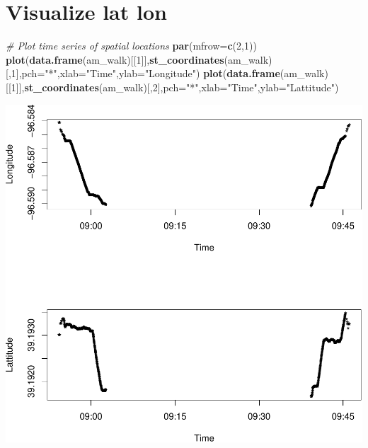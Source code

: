 \documentclass[
]{book}
\newenvironment{Shaded}{\begin{snugshade}}{\end{snugshade}}
\newcommand{\AttributeTok}[1]{\textcolor[rgb]{0.13,0.29,0.53}{#1}}
\newcommand{\CommentTok}[1]{\textcolor[rgb]{0.56,0.35,0.01}{\textit{#1}}}
\newcommand{\DecValTok}[1]{\textcolor[rgb]{0.00,0.00,0.81}{#1}}
\newcommand{\FunctionTok}[1]{\textcolor[rgb]{0.13,0.29,0.53}{\textbf{#1}}}
\newcommand{\NormalTok}[1]{#1}
\newcommand{\StringTok}[1]{\textcolor[rgb]{0.31,0.60,0.02}{#1}}
\begin{document}
\hypertarget{visualize-lat-lon}{%
\section{Visualize lat lon}\label{visualize-lat-lon}}

\begin{Shaded}
\begin{Highlighting}[]
\CommentTok{\# Plot time series of spatial locations}
\FunctionTok{par}\NormalTok{(}\AttributeTok{mfrow=}\FunctionTok{c}\NormalTok{(}\DecValTok{2}\NormalTok{,}\DecValTok{1}\NormalTok{))}
\FunctionTok{plot}\NormalTok{(}\FunctionTok{data.frame}\NormalTok{(am\_walk)[[}\DecValTok{1}\NormalTok{]],}\FunctionTok{st\_coordinates}\NormalTok{(am\_walk)[,}\DecValTok{1}\NormalTok{],}\AttributeTok{pch=}\StringTok{"*"}\NormalTok{,}\AttributeTok{xlab=}\StringTok{"Time"}\NormalTok{,}\AttributeTok{ylab=}\StringTok{"Longitude"}\NormalTok{)}
\FunctionTok{plot}\NormalTok{(}\FunctionTok{data.frame}\NormalTok{(am\_walk)[[}\DecValTok{1}\NormalTok{]],}\FunctionTok{st\_coordinates}\NormalTok{(am\_walk)[,}\DecValTok{2}\NormalTok{],}\AttributeTok{pch=}\StringTok{"*"}\NormalTok{,}\AttributeTok{xlab=}\StringTok{"Time"}\NormalTok{,}\AttributeTok{ylab=}\StringTok{"Lattitude"}\NormalTok{)}
\end{Highlighting}
\end{Shaded}

\includegraphics{_main_files/figure-latex/unnamed-chunk-5-1.pdf}
\end{document}
